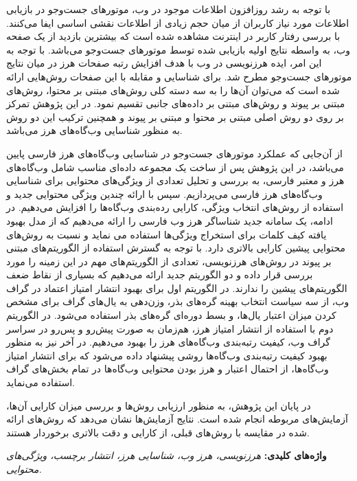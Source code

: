 \documentclass[twoside, a4paper,11pt]{book}
\numberwithin{equation}{chapter}
\numberwithin{table}{chapter}
\numberwithin{figure}{chapter}
\numberwithin{equation}{chapter}
\begin{document}
\begin{spacing}{1.8}
با توجه به رشد روز‌‌افزون اطلاعات موجود در وب، موتورهای جست‌و‌جو در بازیابی اطلاعات مورد نیاز کاربران از میان حجم زیادی از اطلاعات نقشی اساسی ایفا می‌کنند. با بررسی رفتار کاربر در اینترنت مشاهده شده است که بیشترین بازدید از یک صفحه وب، به واسطه نتایج اولیه بازیابی شده توسط موتورهای جست‌و‌جو می‌باشد. با توجه به این امر، ایده هرزنویسی در وب با هدف افزایش رتبه صفحات هرز در میان نتایج موتورهای جست‌و‌جو مطرح شد. برای شناسایی و مقابله با این صفحات روش‌هایی ارائه شده است که می‌توان آن‌ها را به سه دسته کلی روش‌های مبتنی بر محتوا، روش‌های مبتنی بر پیوند و روش‌های مبتنی بر داده‌های جانبی تقسیم نمود. در این پژوهش تمرکز بر روی دو روش اصلی مبتنی بر محتوا و مبتنی بر پیوند و همچنین ترکیب این دو روش به منظور شناسایی وب‌گاه‌های هرز می‌باشد.

از آن‌جایی که عملکرد موتورهای جست‌و‌جو در شناسایی وب‌گاه‌های هرز فارسی پایین می‌باشد، در این پژوهش پس از ساخت یک مجموعه داد‌ه‌ای مناسب شامل وب‌گاه‌های هرز و معتبر فارسی، به بررسی و تحلیل تعدادی از ویژگی‌های محتوایی برای شناسایی وب‌گاه‌های هرز فارسی می‌پردازیم. سپس با ارائه چندین ویژگی محتوایی جدید و استفاده از روش‌های انتخاب ویژگی، کارایی رده‌بندی وب‌گاه‌ها را افزایش می‌دهیم. در ادامه، یک سامانه جدید شناساگر هرز وب فارسی را ارائه می‌دهیم که از مدل بهبود یافته کیف کلمات برای استخراج ویژگی‌ها استفاده می نماید و نسبت به روش‌های محتوایی پیشین کارایی بالاتری دارد. با توجه به گسترش استفاده از الگوریتم‌های مبتنی بر پیوند در روش‌های هرزنویسی، تعدادی از الگوریتم‌های مهم در این زمینه را مورد بررسی قرار داده و دو الگوریتم جدید ارائه می‌دهیم که بسیاری از نقاط ضعف الگوریتم‌های پیشین را ندارند. در الگوریتم اول برای بهبود انتشار امتیاز اعتماد در گراف وب، از سه سیاست انتخاب بهینه گره‌های بذر، وزن‌دهی به یال‌های گراف برای مشخص کردن میزان اعتبار یال‌ها، و بسط دوره‌ای گره‌های بذر استفاده می‌شود. در الگوریتم دوم با استفاده از انتشار امتیاز هرز، هم‌زمان به صورت پیش‌رو و پس‌رو در سراسر گراف وب، کیفیت رتبه‌بندی وب‌گاه‌های هرز را بهبود می‌دهیم.
در آخر نیز به منظور بهبود کیفیت رتبه‌بندی وب‌گاه‌ها روشی پیشنهاد داده می‌شود که برای انتشار امتیاز وب‌گاه‌ها، از احتمال اعتبار و هرز بودن محتوایی وب‌گاه‌ها در تمام بخش‌های گراف استفاده می‌نماید. 

در پایان این پژوهش، به منظور ارزیابی روش‌ها و بررسی میزان کارایی آن‌ها، آزمایش‌های مربوطه انجام شده است. نتایج آزمایش‌ها نشان می‌دهد که روش‌های ارائه شده در مقایسه با روش‌های قبلی، از کارایی و دقت بالاتری برخوردار هستند.
 
\textbf{واژه‌های کلیدی: }\textit{هرزنویسی، هرز وب، شناسایی هرز، انتشار برچسب، ویژگی‌های محتوایی.}
\end{spacing}
\end{document}
